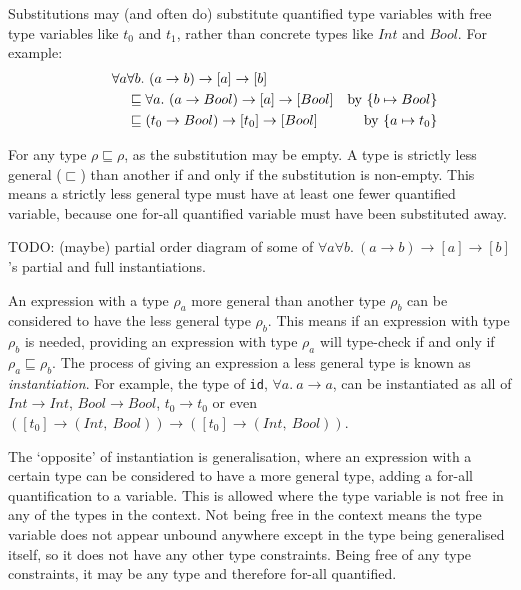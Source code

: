 \documentclass[a4paper,fleqn,oneside,12pt]{report}
\begin{document}
Substitutions may (and often do) substitute quantified type variables with free type variables like $t_0$ and $t_1$, rather than concrete types like $Int$ and $Bool$. For example:
\begin{align*}
\hspace{0.75cm}\forall a & \forall b.\ (a \rightarrow b) \rightarrow [a] \rightarrow [b]
\\& \sqsubseteq \forall a.\ (a \rightarrow Bool) \rightarrow [a] \rightarrow [Bool] &\textrm{by}\ \{ b \mapsto Bool \}
\\&\sqsubseteq (t_0 \rightarrow Bool) \rightarrow [t_0] \rightarrow [Bool] &\textrm{by}\ \{ a \mapsto t_0 \}
\end{align*}

For any type $\rho \sqsubseteq \rho$, as the substitution may be empty. A type is strictly less general ($\sqsubset$) than another if and only if the substitution is non-empty. This means a strictly less general type must have at least one fewer quantified variable, because one for-all quantified variable must have been substituted away.

TODO: (maybe) partial order diagram of some of $\forall a \forall b.\ (a \rightarrow b) \rightarrow [a] \rightarrow [b]$’s partial and full instantiations.

An expression with a type $\rho_a$ more general than another type $\rho_b$ can be considered to have the less general type $\rho_b$. This means if an expression with type $\rho_b$ is needed, providing an expression with type $\rho_a$ will type-check if and only if $\rho_a \sqsubseteq \rho_b$. The process of giving an expression a less general type is known as \textit{instantiation}. For example, the type of \texttt{id}, $\forall a.\ a \rightarrow a$, can be instantiated as all of $Int \rightarrow Int$, $Bool \rightarrow Bool$, $t_0 \rightarrow t_0$ or even $([t_0] \rightarrow (Int,\ Bool)) \rightarrow ([t_0] \rightarrow (Int,\ Bool))$.

The `opposite' of instantiation is generalisation, where an expression with a certain type can be considered to have a more general type, adding a for-all quantification to a variable. This is allowed where the type variable is not free in any of the types in the context. Not being free in the context means the type variable does not appear unbound anywhere except in the type being generalised itself, so it does not have any other type constraints. Being free of any type constraints, it may be any type and therefore for-all quantified.
\end{document}
